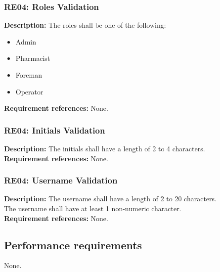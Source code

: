 \begin{adjustwidth}{2em}{0pt}
    \subsubsection*{RE04: Roles Validation}
    \begin{adjustwidth}{1em}{0pt}
        \textbf{Description:}
        The roles shall be one of the following:
        \begin{multicols}{2}
            \begin{itemize}
                \item Admin
                \item Pharmacist
                \item Foreman
                \item Operator
            \end{itemize}
        \end{multicols}
        \textbf{Requirement references:}
        None.
    \end{adjustwidth}
    
    \subsubsection*{RE04: Initials Validation}
    \begin{adjustwidth}{1em}{0pt}
        \textbf{Description:}
        The initials shall have a length of 2 to 4 characters.\\
        \textbf{Requirement references:}
        None.
    \end{adjustwidth}
    
    \subsubsection*{RE04: Username Validation}
    \begin{adjustwidth}{1em}{0pt}
        \textbf{Description:}
        The username shall have a length of 2 to 20 characters.\\
        The username shall have at least 1 non-numeric character.\\
        \textbf{Requirement references:}
        None.
    \end{adjustwidth}
    
    
    
\end{adjustwidth}

\subsection{Performance requirements}
\begin{adjustwidth}{2em}{0pt}

    None.

\end{adjustwidth}

